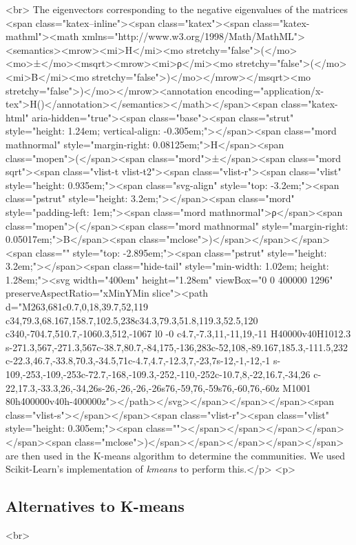 \newline<br>
The eigenvectors corresponding to the negative eigenvalues of the matrices <span class="katex--inline"><span class="katex"><span class="katex-mathml"><math xmlns="http://www.w3.org/1998/Math/MathML"><semantics><mrow><mi>H</mi><mo stretchy="false">(</mo><mo>±</mo><msqrt><mrow><mi>ρ</mi><mo stretchy="false">(</mo><mi>B</mi><mo stretchy="false">)</mo></mrow></msqrt><mo stretchy="false">)</mo></mrow><annotation encoding="application/x-tex">H(\pm {})</annotation></semantics></math></span><span class="katex-html" aria-hidden="true"><span class="base"><span class="strut" style="height: 1.24em; vertical-align: -0.305em;"></span><span class="mord mathnormal" style="margin-right: 0.08125em;">H</span><span class="mopen">(</span><span class="mord">±</span><span class="mord sqrt"><span class="vlist-t vlist-t2"><span class="vlist-r"><span class="vlist" style="height: 0.935em;"><span class="svg-align" style="top: -3.2em;"><span class="pstrut" style="height: 3.2em;"></span><span class="mord" style="padding-left: 1em;"><span class="mord mathnormal">ρ</span><span class="mopen">(</span><span class="mord mathnormal" style="margin-right: 0.05017em;">B</span><span class="mclose">)</span></span></span><span class="" style="top: -2.895em;"><span class="pstrut" style="height: 3.2em;"></span><span class="hide-tail" style="min-width: 1.02em; height: 1.28em;"><svg width="400em" height="1.28em" viewBox="0 0 400000 1296" preserveAspectRatio="xMinYMin slice"><path d="M263,681c0.7,0,18,39.7,52,119
c34,79.3,68.167,158.7,102.5,238c34.3,79.3,51.8,119.3,52.5,120
c340,-704.7,510.7,-1060.3,512,-1067
l0 -0
c4.7,-7.3,11,-11,19,-11
H40000v40H1012.3
s-271.3,567,-271.3,567c-38.7,80.7,-84,175,-136,283c-52,108,-89.167,185.3,-111.5,232
c-22.3,46.7,-33.8,70.3,-34.5,71c-4.7,4.7,-12.3,7,-23,7s-12,-1,-12,-1
s-109,-253,-109,-253c-72.7,-168,-109.3,-252,-110,-252c-10.7,8,-22,16.7,-34,26
c-22,17.3,-33.3,26,-34,26s-26,-26,-26,-26s76,-59,76,-59s76,-60,76,-60z
M1001 80h400000v40h-400000z"></path></svg></span></span></span><span class="vlist-s">​</span></span><span class="vlist-r"><span class="vlist" style="height: 0.305em;"><span class=""></span></span></span></span></span><span class="mclose">)</span></span></span></span></span> are then used in the K-means algorithm to determine the communities. We used Scikit-Learn’s implementation of \textit{kmeans} to perform this.</p>
<p>\subsection{Alternatives to K-means}<br>
